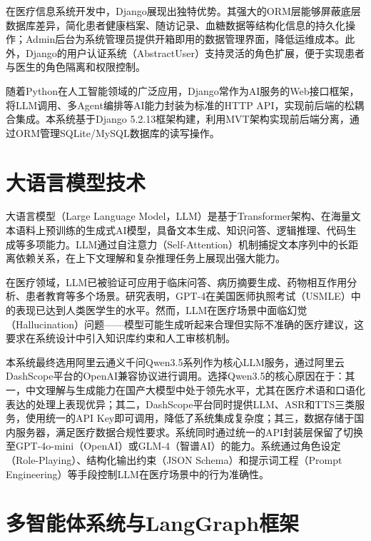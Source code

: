 在医疗信息系统开发中，Django展现出独特优势。其强大的ORM层能够屏蔽底层数据库差异，简化患者健康档案、随访记录、血糖数据等结构化信息的持久化操作；Admin后台为系统管理员提供开箱即用的数据管理界面，降低运维成本\todocite{}。此外，Django的用户认证系统（AbstractUser）支持灵活的角色扩展，便于实现患者与医生的角色隔离和权限控制。

随着Python在人工智能领域的广泛应用，Django常作为AI服务的Web接口框架，将LLM调用、多Agent编排等AI能力封装为标准的HTTP API，实现前后端的松耦合集成\todocite{}。本系统基于Django 5.2.13框架构建，利用MVT架构实现前后端分离，通过ORM管理SQLite/MySQL数据库的读写操作。

\section{大语言模型技术}

大语言模型（Large Language Model，LLM）是基于Transformer架构、在海量文本语料上预训练的生成式AI模型，具备文本生成、知识问答、逻辑推理、代码生成等多项能力\todocite{}。LLM通过自注意力（Self-Attention）机制捕捉文本序列中的长距离依赖关系，在上下文理解和复杂推理任务上展现出强大能力。

在医疗领域，LLM已被验证可应用于临床问答、病历摘要生成、药物相互作用分析、患者教育等多个场景。研究表明，GPT-4在美国医师执照考试（USMLE）中的表现已达到人类医学生的水平\todocite{}。然而，LLM在医疗场景中面临幻觉（Hallucination）问题——模型可能生成听起来合理但实际不准确的医疗建议，这要求在系统设计中引入知识库约束和人工审核机制。

本系统最终选用阿里云通义千问Qwen3.5系列作为核心LLM服务，通过阿里云DashScope平台的OpenAI兼容协议进行调用。选择Qwen3.5的核心原因在于：其一，中文理解与生成能力在国产大模型中处于领先水平，尤其在医疗术语和口语化表达的处理上表现优异；其二，DashScope平台同时提供LLM、ASR和TTS三类服务，使用统一的API Key即可调用，降低了系统集成复杂度；其三，数据存储于国内服务器，满足医疗数据合规性要求。系统同时通过统一的API封装层保留了切换至GPT-4o-mini（OpenAI）或GLM-4（智谱AI）的能力。系统通过角色设定（Role-Playing）、结构化输出约束（JSON Schema）和提示词工程（Prompt Engineering）等手段控制LLM在医疗场景中的行为准确性\todocite{}。

\section{多智能体系统与LangGraph框架}

